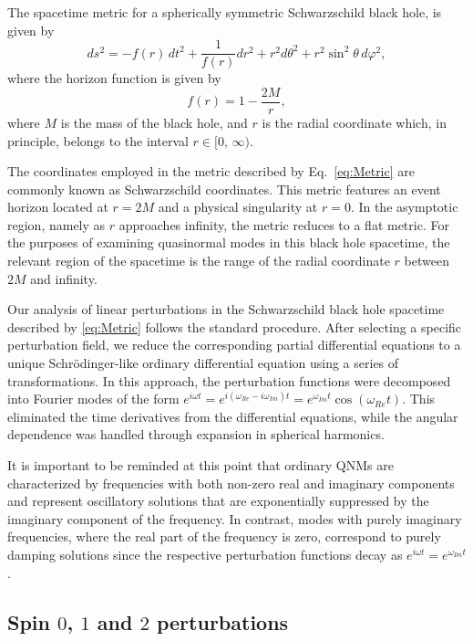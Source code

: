 The spacetime metric for a spherically symmetric Schwarzschild black hole, is given by \cite{Schwarzschild:1916uq}
%
\begin{equation}\label{eq:Metric}
  ds^2=-f(r)\,dt^2+\frac{1}{f(r)}dr^2+r^2d\theta^2+
  r^2\sin^2{\theta}\,d\varphi^2,
\end{equation}
%
where the horizon function is given by
%
\begin{equation}\label{EqHoriFuncHayward}
  f(r)=1-\frac{2M}{r},
\end{equation}
%
where $M$ is the mass of the black hole, and $r$ is the radial coordinate which, in principle, belongs to the interval $r\in [0,\, \infty)$.

The coordinates employed in the metric described by Eq.~\eqref{eq:Metric} are commonly known as Schwarzschild coordinates. This metric features an event horizon located at $r=2M$ and a physical singularity at $r=0$. In the asymptotic region, namely as $r$ approaches infinity, the metric reduces to a flat metric. For the purposes of examining quasinormal modes in this black hole spacetime, the relevant region of the spacetime is the range of the radial coordinate $r$ between $2M$ and infinity.

Our analysis of linear perturbations in the Schwarzschild black hole spacetime described by \eqref{eq:Metric} follows the standard procedure. After selecting a specific perturbation field, we reduce the corresponding partial differential equations to a unique Schrödinger-like ordinary differential equation using a series of transformations. In this approach, the perturbation functions were decomposed into Fourier modes of the form $e^{i\omega t}=e^{i(\omega_{Re}-i \omega_{Im})t}=e^{\omega_{Im} t}\cos{\left(\omega_{Re} t\right)}$. This eliminated the time derivatives from the differential equations, while the angular dependence was handled through expansion in spherical harmonics.

It is important to be reminded at this point that ordinary \acp{QNM} are characterized by frequencies with both non-zero real and imaginary components and represent oscillatory solutions that are exponentially suppressed by the imaginary component of the frequency. In contrast, modes with purely imaginary frequencies, where the real part of the frequency is zero, correspond to purely damping solutions since the respective perturbation functions decay as $ e^{i\omega t}=e^{\omega_{Im} t}$.

\subsection{Spin $0$, $1$ and $2$ perturbations}

